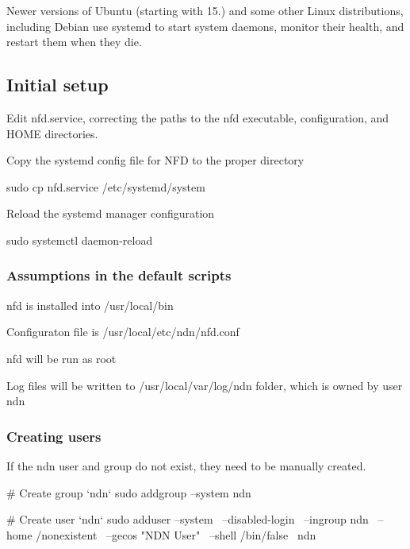 Newer versions of Ubuntu (starting with 15.) and some other Linux distributions, including Debian use systemd to start system daemons, monitor their health, and restart them when they die.

\subsection*{Initial setup }


\begin{DoxyItemize}
\item Edit {\ttfamily nfd.\+service}, correcting the paths to the {\ttfamily nfd} executable, configuration, and {\ttfamily H\+O\+ME} directories.
\item Copy the systemd config file for N\+FD to the proper directory \begin{DoxyVerb}  sudo cp nfd.service /etc/systemd/system
\end{DoxyVerb}

\item Reload the systemd manager configuration \begin{DoxyVerb}  sudo systemctl daemon-reload
\end{DoxyVerb}

\end{DoxyItemize}

\subsubsection*{Assumptions in the default scripts}


\begin{DoxyItemize}
\item {\ttfamily nfd} is installed into {\ttfamily /usr/local/bin}
\item Configuraton file is {\ttfamily /usr/local/etc/ndn/nfd.conf}
\item {\ttfamily nfd} will be run as root
\item Log files will be written to {\ttfamily /usr/local/var/log/ndn} folder, which is owned by user {\ttfamily ndn}
\end{DoxyItemize}

\subsubsection*{Creating users}

If the {\ttfamily ndn} user and group do not exist, they need to be manually created. \begin{DoxyVerb}# Create group `ndn`
sudo addgroup --system ndn

# Create user `ndn`
sudo adduser --system \
             --disabled-login \
             --ingroup ndn \
             --home /nonexistent \
             --gecos "NDN User" \
             --shell /bin/false \
             ndn
\end{DoxyVerb}


